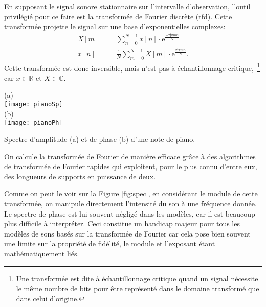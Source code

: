 En supposant le signal sonore stationnaire sur l'intervalle d'observation, l'outil privilégié pour ce faire est la transformée de Fourier discrète (tfd). Cette transformée projette le signal sur une base d'exponentielles complexes:
\begin{eqnarray}
  X[m] &=& \sum_{n=0}^{N-1} x[n] \cdot \mathrm{e}^{\frac{-2 \mathrm{j} \pi nm}{N}} \\
  x[n] &=& \frac{1}{N} \sum_{m=0}^{N-1} X[m] \cdot \mathrm{e}^{\frac{ 2 \mathrm{j} \pi m n }{N}}.
\end{eqnarray}
Cette transformée est donc inversible, mais n'est pas à échantillonnage critique,~\footnote{Une transformée est dite à échantillonnage critique quand un signal nécessite le même nombre de bits pour être représenté dans le domaine transformé que dans celui d'origine.} car $x\in \mathbb{R}$  et $X \in \mathbb{C}$.

\begin{marginfigure}
  \begin{center}
  \footnotesize
  (a) \\
  \texttt{[image: pianoSp]} \\
  (b) \\
  \texttt{[image: pianoPh]}
\end{center}
  \caption{Spectre d'amplitude (a) et de phase (b) d'une note de piano.}
  \label{fig:spec}
\end{marginfigure}

On calcule la transformée de Fourier de manière efficace grâce à des algorithmes de transformée de Fourier rapides qui exploitent, pour le plus connu d'entre eux, des longueurs de supports en puissance de deux.~\cite{cooley1965algorithm}



Comme on peut le voir sur la Figure \ref{fig:spec}, en considérant le module de cette transformée, on manipule directement l'intensité du son à une fréquence donnée. Le spectre de phase est lui souvent négligé dans les modèles, car il est beaucoup plus difficile à interpréter. Ceci constitue un handicap majeur pour tous les modèles de sons basés sur la transformée de Fourier car cela pose bien souvent une limite sur la propriété de fidélité, le module et l'exposant étant mathématiquement liés.


